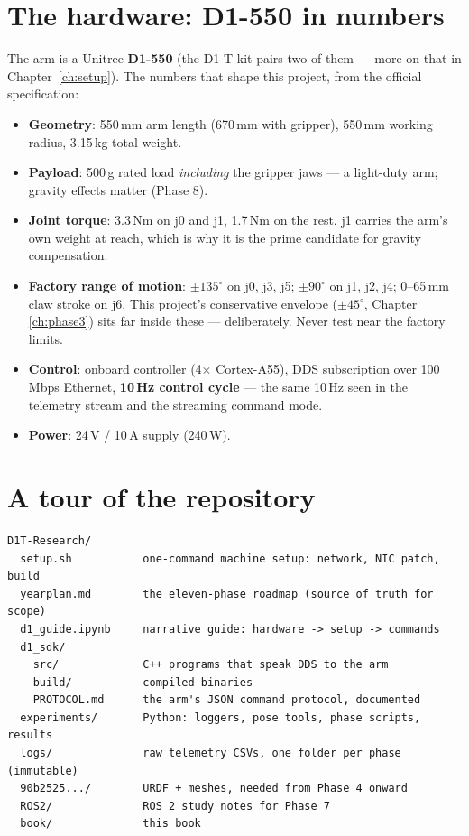 \documentclass[11pt,twoside,openright]{book}
\begin{document}
\section{The hardware: D1-550 in numbers}

The arm is a Unitree \textbf{D1-550} (the D1-T kit pairs two of them ---
more on that in Chapter~\ref{ch:setup}). The numbers that shape this
project, from the official specification:

\begin{itemize}
  \item \textbf{Geometry}: 550\,mm arm length (670\,mm with gripper),
    550\,mm working radius, 3.15\,kg total weight.
  \item \textbf{Payload}: 500\,g rated load \emph{including} the gripper
    jaws --- a light-duty arm; gravity effects matter (Phase 8).
  \item \textbf{Joint torque}: 3.3\,Nm on j0 and j1, 1.7\,Nm on the
    rest. j1 carries the arm's own weight at reach, which is why it is
    the prime candidate for gravity compensation.
  \item \textbf{Factory range of motion}: $\pm135^\circ$ on j0, j3, j5;
    $\pm90^\circ$ on j1, j2, j4; 0--65\,mm claw stroke on j6. This
    project's conservative envelope ($\pm45^\circ$, Chapter
    \ref{ch:phase3}) sits far inside these --- deliberately. Never test
    near the factory limits.
  \item \textbf{Control}: onboard controller (4$\times$ Cortex-A55),
    DDS subscription over 100\,Mbps Ethernet, \textbf{10\,Hz control
    cycle} --- the same 10\,Hz seen in the telemetry stream and the
    streaming command mode.
  \item \textbf{Power}: 24\,V / 10\,A supply (240\,W).
\end{itemize}

\section{A tour of the repository}

\begin{lstlisting}
D1T-Research/
  setup.sh           one-command machine setup: network, NIC patch, build
  yearplan.md        the eleven-phase roadmap (source of truth for scope)
  d1_guide.ipynb     narrative guide: hardware -> setup -> commands
  d1_sdk/
    src/             C++ programs that speak DDS to the arm
    build/           compiled binaries
    PROTOCOL.md      the arm's JSON command protocol, documented
  experiments/       Python: loggers, pose tools, phase scripts, results
  logs/              raw telemetry CSVs, one folder per phase (immutable)
  90b2525.../        URDF + meshes, needed from Phase 4 onward
  ROS2/              ROS 2 study notes for Phase 7
  book/              this book
\end{lstlisting}
\end{document}
